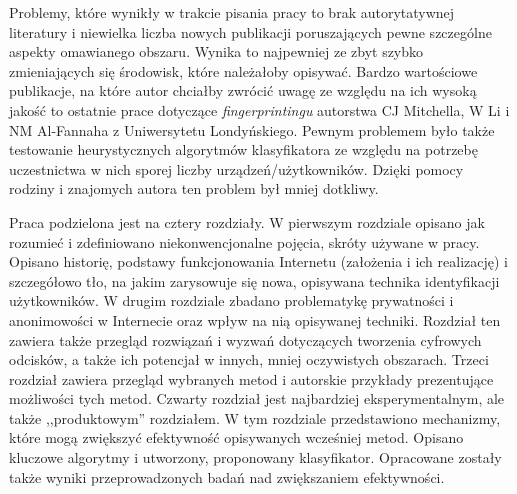 Problemy, które wynikły w trakcie pisania pracy to brak autorytatywnej
literatury i niewielka liczba nowych publikacji poruszających pewne szczególne
aspekty omawianego obszaru. Wynika to najpewniej ze zbyt szybko zmieniających
się środowisk, które należałoby opisywać. Bardzo wartościowe publikacje, na
które autor chciałby zwrócić uwagę ze względu na ich wysoką jakość to ostatnie
prace dotyczące \emph{fingerprintingu} autorstwa CJ Mitchella, W Li i NM
Al-Fannaha z Uniwersytetu Londyńskiego. Pewnym problemem było także testowanie
heurystycznych algorytmów klasyfikatora ze względu na potrzebę uczestnictwa w
nich sporej liczby urządzeń/użytkowników. Dzięki pomocy rodziny i znajomych
autora ten problem był mniej dotkliwy.

Praca podzielona jest na cztery rozdziały. W pierwszym rozdziale opisano jak
rozumieć i zdefiniowano niekonwencjonalne pojęcia, skróty używane w pracy.
Opisano historię, podstawy funkcjonowania Internetu (założenia i ich realizację)
i szczegółowo tło, na jakim zarysowuje się nowa, opisywana technika
identyfikacji użytkowników. W drugim rozdziale zbadano problematykę prywatności
i anonimowości w Internecie oraz wpływ na nią opisywanej techniki. Rozdział ten
zawiera także przegląd rozwiązań i wyzwań dotyczących tworzenia cyfrowych
odcisków, a także ich potencjał w innych, mniej oczywistych obszarach. Trzeci
rozdział zawiera przegląd wybranych metod i autorskie przykłady prezentujące
możliwości tych metod. Czwarty rozdział jest najbardziej eksperymentalnym, ale
także ,,produktowym'' rozdziałem. W tym rozdziale przedstawiono mechanizmy,
które mogą zwiększyć efektywność opisywanych wcześniej metod. Opisano kluczowe
algorytmy i utworzony, proponowany klasyfikator. Opracowane zostały także wyniki
przeprowadzonych badań nad zwiększaniem efektywności.
